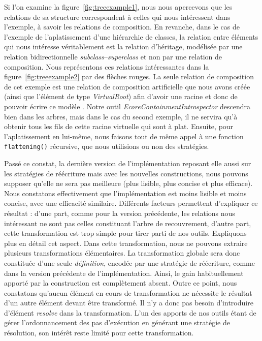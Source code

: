 Si l'on examine la figure~\ref{fig:treeexample1}, nous nous apercevons que les
relations de sa structure correspondent à celles qui nous intéressent dans
l'exemple, à savoir les relations de composition. En revanche, dans le cas de
l'exemple de l'aplatissement d'une hiérarchie de classes, la relation entre
éléments qui nous intéresse véritablement est la relation d'héritage, modélisée
par une relation bidirectionnelle \emph{subclass}--\emph{superclass} et non par
une relation de composition. Nous représentons ces relations \og intéressantes
\fg dans la figure~\ref{fig:treeexample2} par des flèches rouges. La seule
relation de composition de cet exemple est une relation de composition
artificielle que nous avons créée (ainsi que l'élément de type
\emph{VirtualRoot}) afin d'avoir une racine et donc de pouvoir écrire ce modèle
{\emf} {\ecore}. Notre outil \emph{EcoreContainmentIntrospector} descendra
bien dans les arbres, mais dans le cas du second exemple, il ne servira qu'à
obtenir tous les fils de cette racine virtuelle qui sont à plat. Ensuite, pour
l'aplatissement en lui-même, nous faisons tout de même appel à une fonction
\texttt{flattening()} récursive, que nous utilisions ou non des stratégies.


Passé ce constat, la dernière version de l'implémentation reposant elle aussi
sur les stratégies de réécriture mais avec les nouvelles constructions, nous
pouvons supposer qu'elle ne sera pas meilleure (plus lisible, plus concise et
plus efficace). Nous constatons effectivement que l'implémentation est moins
lisible et moins concise, avec une efficacité similaire. Différents facteurs
permettent d'expliquer ce résultat : d'une part, comme pour la version
précédente, les relations nous intéressant ne sont pas celles constituant
l'arbre de recouvrement, d'autre part, cette transformation est trop simple pour
tirer parti de nos outils. Expliquons plus en détail cet aspect. Dans cette
transformation, nous ne pouvons extraire plusieurs transformations
élémentaires. La transformation globale sera donc constituée d'une seule
\emph{définition}, encodée par une stratégie de réécriture, comme dans la
version précédente de l'implémentation. Ainsi, le gain habituellement apporté
par la construction  est complètement absent. Outre ce
point, nous constatons qu'aucun élément en cours de transformation
ne nécessite le résultat d'un autre élément devant être transformé. Il n'y a
donc pas besoin d'introduire d'élément \emph{resolve} dans la transformation.
L'un des apports de nos outils étant de gérer l'ordonnancement des pas
d'exécution en générant une stratégie de résolution, son intérêt reste limité
pour cette transformation.


